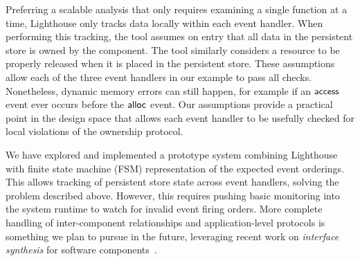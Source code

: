 Preferring a scalable analysis that only requires examining a single function
at a time, Lighthouse only tracks data locally within each event handler.  
%
When performing this tracking, the tool assumes on entry that all data in the
persistent store is owned by the component.
%
The tool similarly considers a resource to be properly released when it is
placed in the persistent store.  
%
These assumptions allow each of the three event handlers in our example to
pass all checks.  
%
Nonetheless, dynamic memory errors can still happen, for example if an
${\mathsf{access}}$ event ever occurs before the ${\mathsf{alloc}}$ event.  
%
Our assumptions provide a practical point in the design space that allows each
event handler to be usefully checked for local violations of the ownership
protocol.  



We have explored and implemented a prototype system combining Lighthouse with
finite state machine (FSM) representation of the expected event orderings.
%
This allows tracking of persistent store state across event handlers, solving
the problem described above.
%
However, this requires pushing basic monitoring into the system runtime to
watch for invalid event firing orders.
%
More complete handling of inter-component relationships and application-level
protocols is something we plan to pursue in the future, leveraging recent work
on {\em interface synthesis} for software components~\cite{AlurPOPL05,HJM05}.

